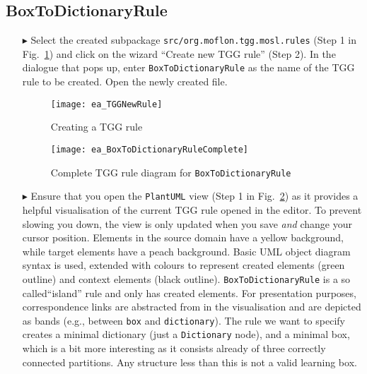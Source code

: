 \newpage
\hypertarget{rules vis}{}
\subsection{BoxToDictionaryRule}
\genHeader

\begin{enumerate}

\item[$\blacktriangleright$] Select the created subpackage \texttt{src/org.moflon.tgg.mosl.rules} (Step 1 in Fig.~\ref{ea:create_tgg_rule}) and click on the wizard ``Create new TGG rule'' (Step 2).
In the dialogue that pops up, enter \texttt{BoxToDictionaryRule} as the name of the TGG rule to be created.
Open the newly created file.

\begin{figure}[htbp]
\begin{center}
  \texttt{[image: ea\_TGGNewRule]}
  \caption{Creating a TGG rule}
  \label{ea:create_tgg_rule}
\end{center}
\end{figure}

\begin{figure}[htbp]
\begin{center}
  \texttt{[image: ea\_BoxToDictionaryRuleComplete]}
  \caption{Complete TGG rule diagram for \texttt{BoxToDictionaryRule}}
  \label{ea:boxtodictionaryrule_complete}
  \end{center}
\end{figure}

\item[$\blacktriangleright$]  Ensure that you open the \texttt{PlantUML} view (Step 1 in Fig.~\ref{ea:boxtodictionaryrule_complete}) as it provides a helpful visualisation of the current TGG rule opened in the editor.
To prevent slowing you down, the view is only updated when you save \emph{and} change your cursor position.
Elements in the source domain have a yellow background, while target elements have a peach background.
Basic UML object diagram syntax is used, extended with colours to represent created elements (green outline) and context elements (black outline).
\texttt{BoxToDictionaryRule} is a so called``island'' rule and only has created elements.
For presentation purposes, correspondence links are abstracted from in the visualisation and are depicted as bands (e.g., between \texttt{box} and \texttt{dictionary}).
The rule we want to specify creates a minimal dictionary (just a \texttt{Dictionary} node), and a minimal box, which is a bit more interesting as it consists already of three correctly connected partitions.
Any structure less than this is not a valid learning box.


\end{enumerate}
